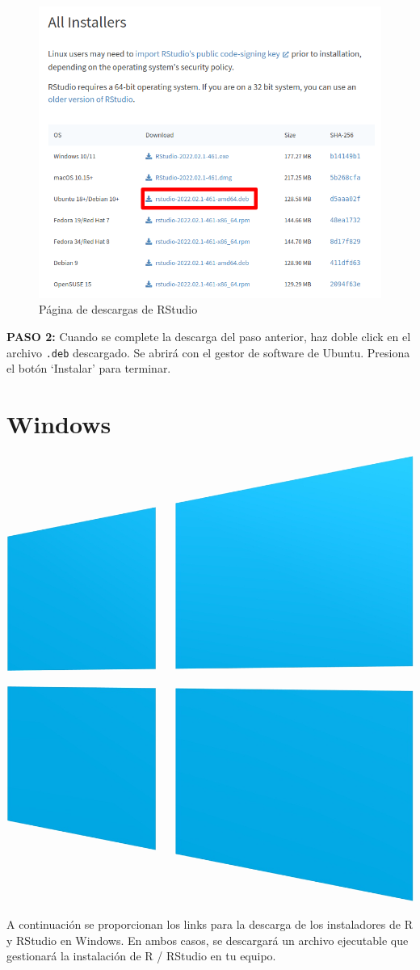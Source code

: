 \documentclass[
  title=normal,
  notoc,
  bib=normal]{mnye}
\begin{document}
\begin{figure}

{\centering \includegraphics[width=0.9\linewidth]{images/rstudio-ubuntu} 

}

\caption{Página de descargas de RStudio}\label{fig:unnamed-chunk-10}
\end{figure}

\textbf{PASO 2: }
Cuando se complete la descarga del paso anterior, haz doble click en el archivo \texttt{.deb} descargado. Se abrirá con el gestor de software de Ubuntu. Presiona el botón `Instalar' para terminar.

\hypertarget{windows}{%
\section{Windows}\label{windows}}

\begin{center}\includegraphics[width=0.15\linewidth]{images/os/windows} \end{center}

A continuación se proporcionan los links para la descarga de los instaladores de R y RStudio en Windows. En ambos casos, se descargará un archivo ejecutable que gestionará la instalación de R / RStudio en tu equipo.
\end{document}
